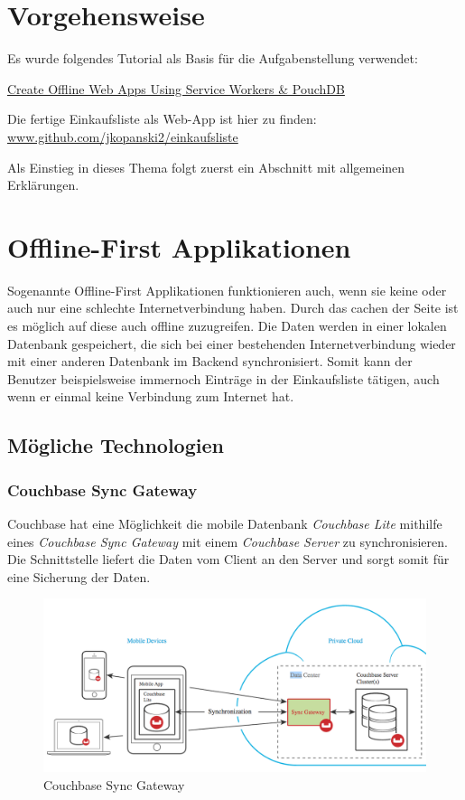 \section{Vorgehensweise}
Es wurde folgendes Tutorial\cite{tutorial} als Basis für die Aufgabenstellung verwendet:

\href{https://www.sitepoint.com/offline-web-apps-service-workers-pouchdb/}{Create Offline Web Apps Using Service Workers \& PouchDB}

Die fertige Einkaufsliste als Web-App ist hier zu finden: \url{www.github.com/jkopanski2/einkaufsliste}

Als Einstieg in dieses Thema folgt zuerst ein Abschnitt mit allgemeinen Erklärungen.

\section{Offline-First Applikationen}

Sogenannte Offline-First\cite{offlinefirst} Applikationen funktionieren auch, wenn sie keine oder auch nur eine schlechte Internetverbindung haben. Durch das cachen der Seite ist es möglich auf diese auch offline zuzugreifen. Die Daten werden in einer lokalen Datenbank gespeichert, die sich bei einer bestehenden Internetverbindung wieder mit einer anderen Datenbank im Backend synchronisiert. \cite{offlinefirstarticle} Somit kann der Benutzer beispielsweise immernoch Einträge in der Einkaufsliste tätigen, auch wenn er einmal keine Verbindung zum Internet hat.  

\subsection{Mögliche Technologien}
\subsubsection{Couchbase Sync Gateway}
Couchbase hat eine Möglichkeit die mobile Datenbank \textit{Couchbase Lite} mithilfe eines \textit{Couchbase Sync Gateway} mit einem \textit{Couchbase Server} zu synchronisieren. Die Schnittstelle liefert die Daten vom Client an den Server und sorgt somit für eine Sicherung der Daten.

\begin{figure}[!h]
  \begin{center}
    \includegraphics[width=0.7\linewidth]{images/sync_gateway.png}
     \caption{Couchbase Sync Gateway\cite{syncgateway}}
    \label{broker}
  \end{center}
\end{figure}

